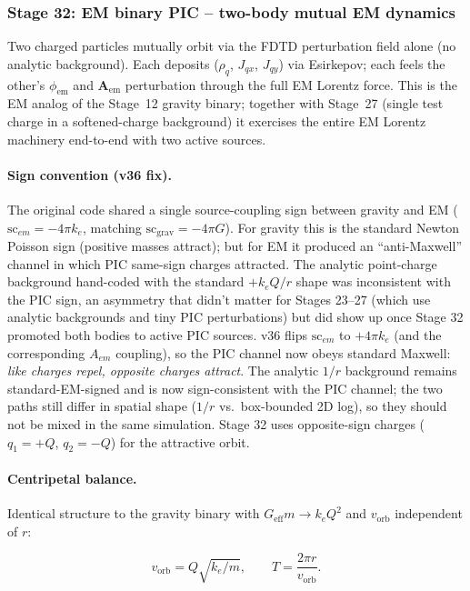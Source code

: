 \documentclass[11pt,a4paper]{article}
\newcommand{\vv}[1]{\mathbf{#1}}
\begin{document}
\subsubsection{Stage 32: EM binary PIC -- two-body mutual EM dynamics}
\label{sec:stage_em_binary_pic}

Two charged particles mutually orbit via the FDTD perturbation field
alone (no analytic background).  Each deposits ($\rho_q$, $J_{qx}$,
$J_{qy}$) via Esirkepov; each feels the other's $\phi_{\mathrm{em}}$
and $\vv{A}_{\mathrm{em}}$ perturbation through the full EM Lorentz
force.  This is the EM analog of the Stage~12 gravity binary; together
with Stage~27 (single test charge in a softened-charge background) it
exercises the entire EM Lorentz machinery end-to-end with two active
sources.

\paragraph{Sign convention (v36 fix).}  The original code shared a
single source-coupling sign between gravity and EM ($\mathrm{sc}_{em}
= -4\pi k_e$, matching $\mathrm{sc}_{\mathrm{grav}} = -4\pi G$).
For gravity this is the standard Newton Poisson sign (positive masses
attract); but for EM it produced an ``anti-Maxwell'' channel in which
PIC same-sign charges attracted.  The analytic point-charge background
hand-coded with the standard $+k_e Q / r$ shape was inconsistent with
the PIC sign, an asymmetry that didn't matter for Stages 23--27 (which
use analytic backgrounds and tiny PIC perturbations) but did show up
once Stage 32 promoted both bodies to active PIC sources.  v36 flips
$\mathrm{sc}_{em}$ to $+4 \pi k_e$ (and the corresponding $A_{em}$
coupling), so the PIC channel now obeys standard Maxwell:
\emph{like charges repel, opposite charges attract}.  The analytic
$1/r$ background remains standard-EM-signed and is now sign-consistent
with the PIC channel; the two paths still differ in spatial shape
($1/r$ vs.\ box-bounded 2D log), so they should not be mixed in the
same simulation.  Stage 32 uses opposite-sign charges
($q_1 = +Q$, $q_2 = -Q$) for the attractive orbit.

\paragraph{Centripetal balance.}  Identical structure to the gravity
binary with $G_{\mathrm{eff}} m \to k_e Q^2$ and $v_{\mathrm{orb}}$
independent of $r$:

\begin{equation}
  v_{\mathrm{orb}} = Q\sqrt{k_e / m},
  \qquad T = \frac{2\pi r}{v_{\mathrm{orb}}}.
\end{equation}
\end{document}
